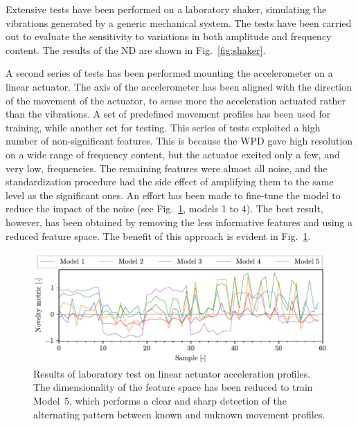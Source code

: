 Extensive tests have been performed on a laboratory shaker, simulating the vibrations generated by a generic mechanical system. The tests have been carried out to evaluate the sensitivity to variations in both amplitude and frequency content. The results of the ND are shown in Fig.~\ref{fig:shaker}.

A second series of tests has been performed mounting the accelerometer on a linear actuator. The axis of the accelerometer has been aligned with the direction of the movement of the actuator, to sense more the acceleration actuated rather than the vibrations. A set of predefined movement profiles has been used for training, while another set for testing. This series of tests exploited a high number of non-significant features. This is because the WPD gave high resolution on a wide range of frequency content, but the actuator excited only a few, and very low, frequencies. The remaining features were almost all noise, and the standardization procedure had the side effect of amplifying them to the same level as the significant ones. An effort has been made to fine-tune the model to reduce the impact of the noise (see Fig.~\ref{fig:linear}, models 1 to 4). The best result, however, has been obtained by removing the less informative features and using a reduced feature space. The benefit of this approach is evident in Fig.~\ref{fig:linear}.


\begin{figure}
    \includegraphics[width=\linewidth]{images/linear.pdf}
    \caption{Results of laboratory test on linear actuator acceleration profiles. The dimensionality of the feature space has been reduced to train Model~5, which performs a clear and sharp detection of the alternating pattern between known and unknown movement profiles.}
    \label{fig:linear}
\end{figure}